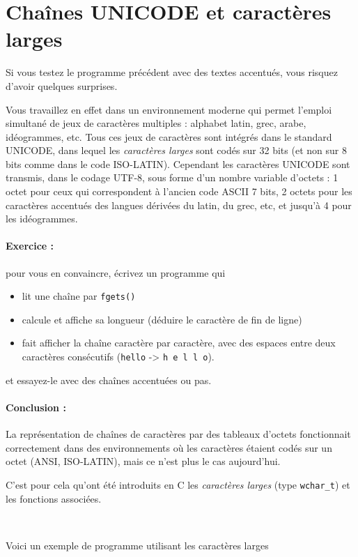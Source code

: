 \documentclass[10pt]{article}
\begin{document}
\section{Chaînes UNICODE et caractères larges}

Si vous testez le programme précédent avec des textes
accentués, vous risquez d'avoir quelques surprises.

Vous travaillez en effet dans un environnement moderne qui permet
l'emploi simultané de jeux de caractères multiples : alphabet latin, grec,
arabe, idéogrammes, etc. Tous ces jeux de caractères sont intégrés dans
le standard UNICODE, dans lequel les \emph{caractères larges} sont
codés sur 32 bits (et non sur 8 bits comme dans le code ISO-LATIN).
Cependant les caractères UNICODE sont transmis, dans le codage UTF-8,
sous forme d'un nombre variable d'octets : 1 octet pour ceux qui correspondent
à l'ancien code ASCII 7 bits, 2 octets pour les caractères accentués
des langues dérivées du latin, du grec, etc, et jusqu'à 4 pour les idéogrammes.

\paragraph{Exercice : } pour vous en convaincre, écrivez un programme qui
\begin{itemize}
\item lit une chaîne par \texttt{fgets()}
\item calcule et affiche sa longueur (déduire le caractère de fin de ligne)
\item fait afficher la chaîne caractère par caractère, avec des espaces entre
deux caractères consécutifs (\texttt{hello} -> \texttt{h e l l o}).
\end{itemize}
et essayez-le avec des chaînes accentuées ou pas.

\paragraph{Conclusion : } La représentation de chaînes de caractères 
par des tableaux d'octets
fonctionnait correctement dans des environnements où les caractères étaient
codés sur un octet (ANSI, ISO-LATIN), mais ce n'est plus le cas aujourd'hui.


C'est pour cela qu'ont été introduits en C les \emph{caractères larges} (type
\texttt{wchar\_t}) et les fonctions associées.


Voici un exemple de programme utilisant les caractères larges
\end{document}
